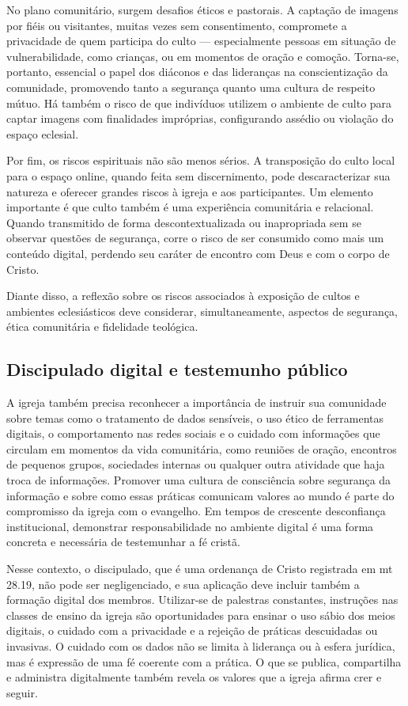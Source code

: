 No plano comunitário, surgem desafios éticos e pastorais. A captação de imagens por fiéis ou visitantes, muitas vezes sem consentimento, compromete a privacidade de quem participa do culto — especialmente pessoas em situação de vulnerabilidade, como crianças, ou em momentos de oração e comoção. Torna-se, portanto, essencial o papel dos diáconos e das lideranças na conscientização da comunidade, promovendo tanto a segurança quanto uma cultura de respeito mútuo. Há também o risco de que indivíduos utilizem o ambiente de culto para captar imagens com finalidades impróprias, configurando assédio ou violação do espaço eclesial.

Por fim, os riscos espirituais não são menos sérios. A transposição do culto local para o espaço online, quando feita sem discernimento, pode descaracterizar sua natureza e oferecer grandes riscos à igreja e aos participantes. Um elemento importante é que culto também é uma experiência comunitária e relacional. Quando transmitido de forma descontextualizada ou inapropriada sem se observar questões de segurança, corre o risco de ser consumido como mais um conteúdo digital, perdendo seu caráter de encontro com Deus e com o corpo de Cristo.

Diante disso, a reflexão sobre os riscos associados à exposição de cultos e ambientes eclesiásticos deve considerar, simultaneamente, aspectos de segurança, ética comunitária e fidelidade teológica.

\subsection{Discipulado digital e testemunho público}

A igreja também precisa reconhecer a importância de instruir sua comunidade sobre temas como o tratamento de dados sensíveis, o uso ético de ferramentas digitais, o comportamento nas redes sociais e o cuidado com informações que circulam em momentos da vida comunitária, como reuniões de oração, encontros de pequenos grupos, sociedades internas ou qualquer outra atividade que haja troca de informações. Promover uma cultura de consciência sobre segurança da informação e sobre como essas práticas comunicam valores ao mundo é parte do compromisso da igreja com o evangelho. Em tempos de crescente desconfiança institucional, demonstrar responsabilidade no ambiente digital é uma forma concreta e necessária de testemunhar a fé cristã.

Nesse contexto, o discipulado, que é uma ordenança de Cristo registrada em \gls{mt} 28.19, não pode ser negligenciado, e sua aplicação deve incluir também a formação digital dos membros. Utilizar-se de palestras constantes, instruções nas classes de ensino da igreja são oportunidades para ensinar o uso sábio dos meios digitais, o cuidado com a privacidade e a rejeição de práticas descuidadas ou invasivas. O cuidado com os dados não se limita à liderança ou à esfera jurídica, mas é expressão de uma fé coerente com a prática. O que se publica, compartilha e administra digitalmente também revela os valores que a igreja afirma crer e seguir.

